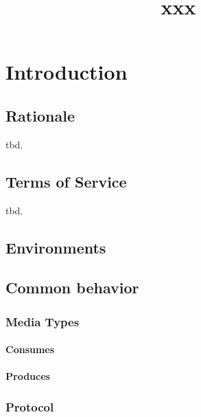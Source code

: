 \documentclass{report}
\begin{document}
\title{xxx}
\author{}
\maketitle

\chapter{Introduction}

\section{Rationale}
tbd.

\section{Terms of Service}
tbd.

\section{Environments}



\section{Common behavior}

\subsection{Media Types}

\subsubsection{Consumes}

\subsubsection{Produces}


\subsection{Protocol}
\end{document}
